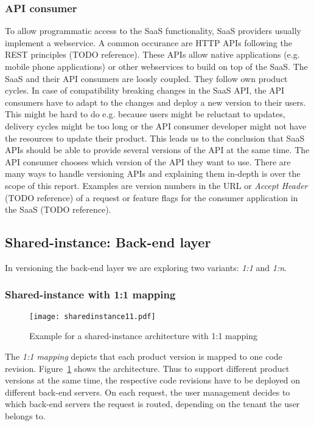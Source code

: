 \subsubsection{API consumer} To allow programmatic access to the SaaS functionality, SaaS providers usually implement a webservice. A common occurance are HTTP APIs following the REST principles (TODO reference). These APIs allow native applications (e.g. mobile phone applications) or other webservices to build on top of the SaaS. The SaaS and their API consumers are loosly coupled. They follow own product cycles. In case of compatibility breaking changes in the SaaS API, the API consumers have to adapt to the changes and deploy a new version to their users. This might be hard to do e.g. because users might be reluctant to updates, delivery cycles might be too long or the API consumer developer might not have the resources to update their product. This leads us to the conclusion that SaaS APIs should be able to provide several versions of the API at the same time. The API consumer chooses which version of the API they want to use. There are many ways to handle versioning APIs and explaining them in-depth is over the scope of this report. Examples are version numbers in the URL or \emph{Accept Header} (TODO reference) of a request or feature flags for the consumer application in the SaaS (TODO reference).


\subsection{Shared-instance: Back-end layer}

In versioning the back-end layer we are exploring two variants: \emph{1:1} and \emph{1:n}.

\subsubsection{Shared-instance with 1:1 mapping}

\begin{figure}
\centering
\texttt{[image: sharedinstance11.pdf]}
\caption{Example for a shared-instance architecture with 1:1 mapping}
\label{fig:sharedinstance11}
\end{figure}

The \emph{1:1 mapping} depicts that each product version is mapped to one code revision. Figure~\ref{fig:sharedinstance11} shows the architecture. Thus to support different product versions at the same time, the respective code revisions have to be deployed on different back-end servers. On each request, the user management decides to which back-end servers the request is routed, depending on the tenant the user belongs to.


